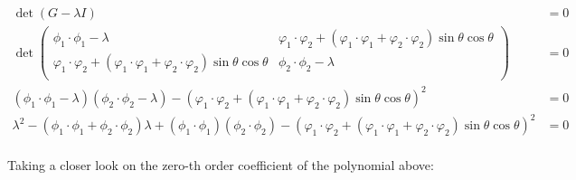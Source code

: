 \documentclass[11pt]{article}
\begin{document}
\begin{align*}
\det (G - \lambda I) &= 0 \\
\det \begin{pmatrix}
\phi_1 \cdot \phi_1 - \lambda & \varphi_1\cdot\varphi_2 + \left( \varphi_1\cdot\varphi_1 + \varphi_2\cdot\varphi_2 \right) \sin \theta \cos \theta \\
\varphi_1\cdot\varphi_2 + \left( \varphi_1\cdot\varphi_1 + \varphi_2\cdot\varphi_2 \right) \sin \theta \cos \theta & \phi_2 \cdot \phi_2 - \lambda \\
\end{pmatrix} &= 0 \\
\left( \phi_1 \cdot \phi_1 - \lambda \right)\left( \phi_2 \cdot \phi_2 - \lambda \right) - \left( \varphi_1\cdot\varphi_2 + \left( \varphi_1\cdot\varphi_1 + \varphi_2\cdot\varphi_2 \right) \sin \theta \cos \theta \right)^2 &= 0 \\
\lambda^2 - \left( \phi_1 \cdot \phi_1 + \phi_2 \cdot \phi_2 \right) \lambda + \left( \phi_1 \cdot \phi_1 \right)\left( \phi_2 \cdot \phi_2 \right) - \left( \varphi_1\cdot\varphi_2 + \left( \varphi_1\cdot\varphi_1 + \varphi_2\cdot\varphi_2 \right) \sin \theta \cos \theta \right)^2 &= 0 \\
\end{align*}

Taking a closer look on the zero-th order coefficient of the polynomial above:
\end{document}
